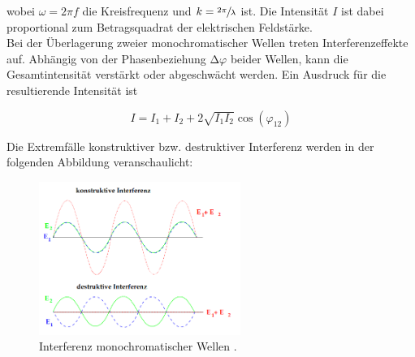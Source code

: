 \noindent wobei $\omega = 2\pi{}f$ die Kreisfrequenz und $k = \sfrac{2\pi}{\lambda}$ ist. Die Intensität $I$ ist dabei proportional 
zum Betragsquadrat der elektrischen Feldstärke.\\

\noindent Bei der Überlagerung zweier monochromatischer Wellen treten Interferenzeffekte auf. Abhängig von der Phasenbeziehung $\increment\varphi$
beider Wellen, kann die Gesamtintensität verstärkt oder abgeschwächt werden. Ein Ausdruck für die resultierende Intensität ist 

\begin{equation}
\label{eqn:Intensitaet}
    I = I_1 + I_2 + 2\sqrt{I_1I_2}\cos\left(\varphi_{12}\right)
\end{equation}

\noindent Die Extremfälle konstruktiver bzw. destruktiver Interferenz werden in der folgenden Abbildung veranschaulicht:

\begin{figure}
    \centering
    \includegraphics[height=5cm]{content/Interferenz.png}
    \caption{Interferenz monochromatischer Wellen \cite{Versuchsanleitung_v401}.}
    \label{fig:Interferenz}
\end{figure}

